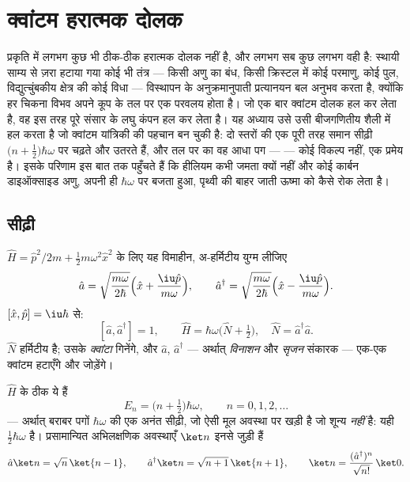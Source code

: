 \chapter{क्वांटम हरात्मक दोलक}\label{ch:b3:harmonic-oscillator}

प्रकृति में लगभग कुछ भी ठीक-ठीक हरात्मक दोलक नहीं है, और लगभग सब कुछ
लगभग वही है: स्थायी साम्य से ज़रा हटाया गया कोई भी तंत्र --- किसी अणु का
बंध, किसी क्रिस्टल में कोई परमाणु, कोई पुल, विद्युत्चुंबकीय क्षेत्र की
कोई विधा --- विस्थापन के अनुक्रमानुपाती प्रत्यानयन बल अनुभव करता है,
क्योंकि हर चिकना विभव अपने कूप के तल पर एक परवलय होता है। जो एक बार
क्वांटम दोलक हल कर लेता है, वह इस तरह पूरे संसार के लघु कंपन हल कर
लेता है। यह अध्याय उसे उसी बीजगणितीय शैली में हल करता है जो क्वांटम
यांत्रिकी की पहचान बन चुकी है: दो  स्तरों की एक पूरी तरह
समान सीढ़ी $\big(n +
\tfrac12\big)\hbar\omega$ पर चढ़ते और उतरते हैं, और तल पर का वह आधा पग
---  --- कोई विकल्प नहीं, एक प्रमेय है।
इसके परिणाम इस बात तक पहुँचते हैं कि हीलियम कभी जमता क्यों नहीं और
कोई कार्बन डाइऑक्साइड अणु, अपनी ही $\hbar\omega$ पर बजता हुआ, पृथ्वी की
बाहर जाती ऊष्मा को कैसे रोक लेता है।

\section{सीढ़ी}

\begin{definition}[सोपान संकारक]\label{def:b3:harmonic-oscillator:ladder}
$\hat H = \hat p^2/2m + \tfrac12 m\omega^2\hat x^2$ के लिए यह
विमाहीन, अ-हर्मिटीय युग्म लीजिए
\[
\hat a = \sqrt{\frac{m\omega}{2\hbar}}\Big(\hat x +
\frac{\iu\hat p}{m\omega}\Big) , \qquad
\hat a^\dagger = \sqrt{\frac{m\omega}{2\hbar}}\Big(\hat x -
\frac{\iu\hat p}{m\omega}\Big) .
\]
$[\hat x, \hat p] = \iu\hbar$ से:
\[
[\hat a, \hat a^\dagger] = 1 , \qquad
\hat H = \hbar\omega\Big(\hat N + \tfrac12\Big) , \quad
\hat N = \hat a^\dagger\hat a .
\]
$\hat N$ हर्मिटीय है; उसके  \emph{क्वांटा} गिनेंगे, और
$\hat a$, $\hat a^\dagger$ --- अर्थात् \emph{विनाशन} और
\emph{सृजन} संकारक --- एक-एक क्वांटम हटाएँगे और जोड़ेंगे।
\end{definition}

\begin{theorem}[वर्णक्रम, केवल बीजगणित से]\label{thm:b3:harmonic-oscillator:spectrum}
$\hat H$ के  ठीक ये हैं
\[
E_n = \Big(n + \tfrac12\Big)\hbar\omega , \qquad n = 0, 1, 2, \dots
\]
--- अर्थात् बराबर पगों $\hbar\omega$ की एक अनंत सीढ़ी, जो ऐसी मूल
अवस्था पर खड़ी है जो शून्य \emph{नहीं} है: यही \emph{}
$\tfrac12\hbar\omega$ है। प्रसामान्यित अभिलक्षणिक अवस्थाएँ $\ket n$
इनसे जुड़ी हैं
\[
\hat a\ket n = \sqrt n\,\ket{n - 1} , \qquad
\hat a^\dagger\ket n = \sqrt{n + 1}\,\ket{n + 1} ,
\qquad
\ket n = \frac{(\hat a^\dagger)^n}{\sqrt{n!}}\,\ket0 .
\]
\end{theorem}

